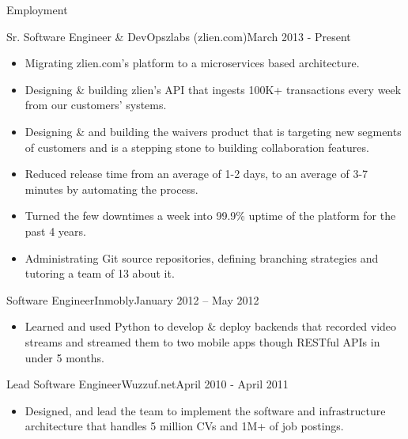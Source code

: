\documentclass[]{mosabcv}
\begin{document}
	\makeheader
	
	
	\begin{cvsection}{Employment}
		\begin{cvsubsection}{Sr. Software Engineer \& DevOps}{zlabs (zlien.com)}{March 2013 - Present}
		\begin{itemize}
				\item Migrating zlien.com's platform to a microservices based architecture.
				\item Designing \& building zlien's API that ingests 100K+ transactions every week from our customers' systems.
				\item Designing \& and building the waivers product that is targeting new segments of customers and is a stepping stone to building collaboration features.
				\item Reduced release time from an average of 1-2 days, to an average of 3-7 minutes by automating the process.
				\item Turned the few downtimes a week into 99.9\% uptime of the platform for the past 4 years.
				\item Administrating Git source repositories, defining branching strategies and tutoring a team of 13 about it.
			\end{itemize}
		\end{cvsubsection}
		
		\begin{cvsubsection}{Software Engineer}{Inmobly}{January 2012 – May 2012}		
			\begin{itemize}
				\item Learned and used Python to develop \& deploy backends that recorded video streams and streamed them to two mobile apps though RESTful APIs in under 5 months.
			\end{itemize}
		\end{cvsubsection}
		
		\begin{cvsubsection}{Lead Software Engineer}{Wuzzuf.net}{April 2010 - April 2011}			
			\begin{itemize}
				\item Designed, and lead the team to implement the software and infrastructure architecture that handles 5 million CVs and 1M+ of job postings.
			\end{itemize}
		\end{cvsubsection}
	

\end{cvsection}
\end{document}
